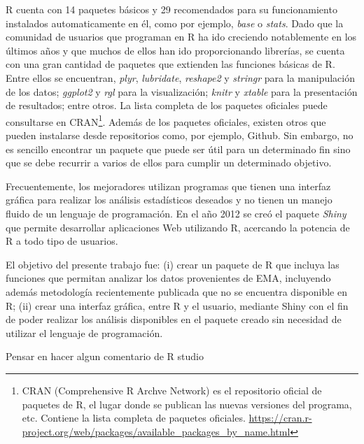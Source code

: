 R cuenta con 14 paquetes básicos y 29 recomendados para su funcionamiento instalados automaticamente en él, como por ejemplo, \emph{base} o \emph{stats}. Dado que la comunidad de usuarios que programan en R ha ido creciendo notablemente en los últimos años y que muchos de ellos han ido proporcionando librerías, se cuenta con una gran cantidad de paquetes que extienden las funciones básicas de R. Entre ellos se encuentran, \emph{plyr}, \emph{lubridate}, \emph{reshape2} y \emph{stringr} para la manipulación de los datos; \emph{ggplot2} y \emph{rgl} para la visualización; \emph{knitr} y \emph{xtable} para la presentación de resultados; entre otros. La lista completa de los paquetes oficiales puede consultarse en CRAN\footnote{CRAN (Comprehensive R Archve Network) es el repositorio oficial de paquetes de R, el lugar donde se publican las nuevas versiones del programa, etc. Contiene la lista completa de paquetes oficiales. \url{https://cran.r-project.org/web/packages/available_packages_by_name.html}}. Además de los paquetes oficiales, existen otros que pueden instalarse desde repositorios como, por ejemplo, Github. Sin embargo, no es sencillo encontrar un paquete que puede ser útil para un determinado fin sino que se debe recurrir a varios de ellos para cumplir un determinado objetivo. 

Frecuentemente, los mejoradores utilizan programas que tienen una interfaz gráfica para realizar los análisis estadísticos deseados y no tienen un manejo fluido de un lenguaje de programación. En el año 2012 se creó el paquete \emph{Shiny} que permite desarrollar aplicaciones Web utilizando R, acercando la potencia de R a todo tipo de usuarios.

El objetivo del presente trabajo fue: (i) crear un paquete de R que incluya las funciones que permitan analizar los datos provenientes de EMA, incluyendo además metodología recientemente publicada que no se encuentra disponible en R; (ii) crear una interfaz gráfica, entre R y el usuario, mediante Shiny con el fin de poder realizar los análisis disponibles en el paquete creado sin necesidad de utilizar el lenguaje de programación.



{\Huge{Pensar en hacer algun comentario de R studio}}